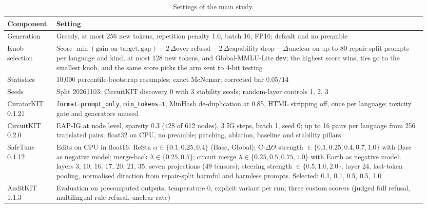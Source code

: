 \documentclass[11pt]{article}
\begin{document}
\begin{table}[t]
\centering\footnotesize
\begin{tabular}{@{}L{2.6cm}L{12.9cm}@{}}
\toprule
Component & Setting \\
\midrule
Generation & Greedy, at most 256 new tokens, repetition penalty 1.0, batch 16, FP16; default and no preamble \\
Knob selection & Score $\min(\text{gain on target}, \text{gap}) - 2\,\Delta\text{over-refusal} -
2\,\Delta\text{capability drop} - \Delta\text{unclear}$ on up to 80 repair-split prompts per language and kind, at
most 128 new tokens, and Global-MMLU-Lite \texttt{dev}; the highest score wins, ties go to the smallest knob, and the
same score picks the arm sent to 4-bit testing \\
Statistics & 10,000 percentile-bootstrap resamples; exact McNemar; corrected bar $0.05/14$ \\
Seeds & Split 20261103; CircuitKIT discovery 0 with 3 stability seeds; random-layer controls 1, 2, 3 \\
CuratorKIT 0.1.21 & \texttt{format=prompt\_only}, \texttt{min\_tokens=1}, MinHash de-duplication at 0.85, HTML stripping
off, once per language; toxicity gate and generators unused \\
CircuitKIT 0.2.0 & EAP-IG at node level, sparsity 0.3 (428 of 612 nodes), 3 IG steps, batch 1, seed 0; up to 16 pairs
per language from 256 translated pairs; float32 on CPU, no preamble; patching, ablation, baseline and stability
pillars \\
SafeTune 0.1.12 & Edits on CPU in float16. ReSta $\alpha \in \{0.1, 0.25, 0.4\}$ (Base, Global); C-$\Delta\Theta$
strength $\in \{0.1, 0.25, 0.4, 0.7, 1.0\}$ with Base as negative model; merge-back $\lambda \in \{0.25, 0.5\}$;
circuit merge $\lambda \in \{0.25, 0.5, 0.75, 1.0\}$ with Earth as negative model; layers 3, 10, 16, 17, 20, 21, 35,
seven projections (49 tensors); steering strength $\in \{0.5, 1.0, 2.0\}$, layer 24, last-token pooling, normalised
direction from repair-split harmful and harmless prompts. Selected: 0.1, 0.1, 0.5, 0.5, 1.0 \\
AuditKIT 1.1.3 & Evaluation on precomputed outputs, temperature 0, explicit variant per run; three custom scorers
(judged full refusal, multilingual rule refusal, unclear rate) \\
\bottomrule
\end{tabular}
\caption{Settings of the main study.}
\label{tab:hparams-main}
\end{table}
\end{document}
